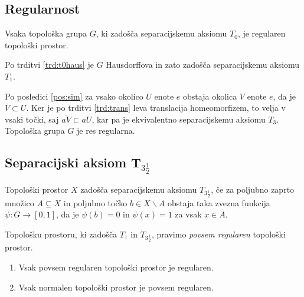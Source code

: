 \documentclass[mat1]{fmfdelo}
\newcommand{\closure}[1]{\overline{#1}}
\begin{document}
\subsection{Regularnost}

\begin{izrek}\label{izr:t3}
	Vsaka topološka grupa $G$, ki zadošča separacijskemu aksiomu $T_0$, je regularen topološki prostor.
\end{izrek}

\begin{dokaz}
	Po trditvi \ref{trd:t0haus} je $G$ Hausdorffova in zato zadošča separacijskemu aksiomu $T_1$.
	
	Po posledici \ref{pos:sim} za vsako okolico $U$ enote $e$ obstaja okolica $V$ enote $e$, da je $\closure{V} \subset U$. Ker je po trditvi \ref{trd:trans} leva translacija homeomorfizem, to velja v vsaki točki, saj $\closure{aV} \subset aU$, kar pa je ekvivalentno separacijskemu aksiomu $T_3$. Topološka grupa $G$ je res regularna.
\end{dokaz}


\subsection{Separacijski aksiom T$_{3 \frac{1}{2}}$}

\begin{definicija}
	Topološki prostor $X$ zadošča separacijskemu aksiomu $T_{3 \frac{1}{2}}$, če za poljubno zaprto množico $A \subseteq X$ in poljubno točko $b \in X\backslash A$ obstaja taka zvezna funkcija $\psi\colon G \to [0, 1]$, da je $\psi (b) = 0$ in $\psi (x) = 1$ za vsak $x \in A$.
\end{definicija}

\begin{opomba}
	Topološku prostoru, ki zadošča $T_1$ in $T_{3 \frac{1}{2}}$, pravimo \emph{povsem regularen} topološki prostor.
\end{opomba}


\begin{trditev}\label{pos:reghaus}
\begin{enumerate}
\item Vsak povsem regularen topološki prostor je regularen.\label{podtrd:reghaus1}
\item Vsak normalen topološki prostor je povsem regularen.\label{podtrd:reghaus2}
\end{enumerate}
\end{trditev}
\end{document}
